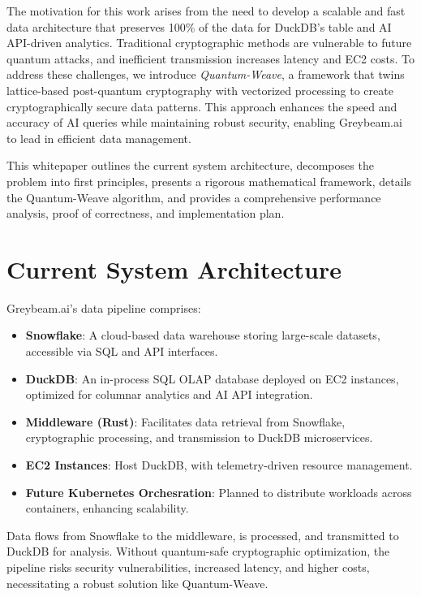 \documentclass[12pt]{article}
\begin{document}
The motivation for this work arises from the need to develop a scalable and fast data architecture that preserves 100\% of the data for DuckDB’s table and AI API-driven analytics. Traditional cryptographic methods are vulnerable to future quantum attacks, and inefficient transmission increases latency and EC2 costs. To address these challenges, we introduce \textit{Quantum-Weave}, a framework that twins lattice-based post-quantum cryptography with vectorized processing to create cryptographically secure data patterns. This approach enhances the speed and accuracy of AI queries while maintaining robust security, enabling Greybeam.ai to lead in efficient data management.

This whitepaper outlines the current system architecture, decomposes the problem into first principles, presents a rigorous mathematical framework, details the Quantum-Weave algorithm, and provides a comprehensive performance analysis, proof of correctness, and implementation plan.

\section{Current System Architecture}
Greybeam.ai’s data pipeline comprises:
\begin{itemize}
    \item \textbf{Snowflake}: A cloud-based data warehouse storing large-scale datasets, accessible via SQL and API interfaces.
    \item \textbf{DuckDB}: An in-process SQL OLAP database deployed on EC2 instances, optimized for columnar analytics and AI API integration.
    \item \textbf{Middleware (Rust)}: Facilitates data retrieval from Snowflake, cryptographic processing, and transmission to DuckDB microservices.
    \item \textbf{EC2 Instances}: Host DuckDB, with telemetry-driven resource management.
    \item \textbf{Future Kubernetes Orchesration}: Planned to distribute workloads across containers, enhancing scalability.
\end{itemize}
Data flows from Snowflake to the middleware, is processed, and transmitted to DuckDB for analysis. Without quantum-safe cryptographic optimization, the pipeline risks security vulnerabilities, increased latency, and higher costs, necessitating a robust solution like Quantum-Weave.
\end{document}

